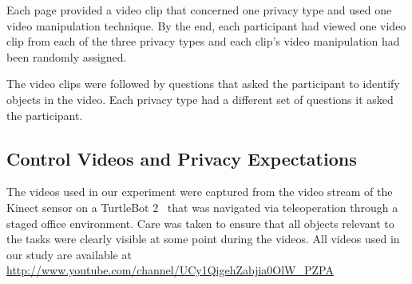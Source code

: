 \documentclass{acm_proc_article-sp}
\begin{document}
Each page provided a video clip that concerned one privacy type and used one video manipulation technique. By the end, each participant had viewed one video clip from each of the three privacy types and each clip's video manipulation had been randomly assigned.

 The video clips were followed by questions that asked the participant to identify objects in the video. Each privacy type had a different set of questions it asked the participant.

\subsection{Control Videos and Privacy Expectations}
The videos used in our experiment were captured from the video stream of the Kinect sensor on a TurtleBot 2~\cite{TurtleBot:2012} that was navigated via teleoperation through a staged office environment. Care was taken to ensure that all objects relevant to the tasks were clearly visible at some point during the videos.  All videos used in our study are available at 
\url {http://www.youtube.com/channel/UCy1QigehZabjia0OlW_PZPA} 
\end{document}

